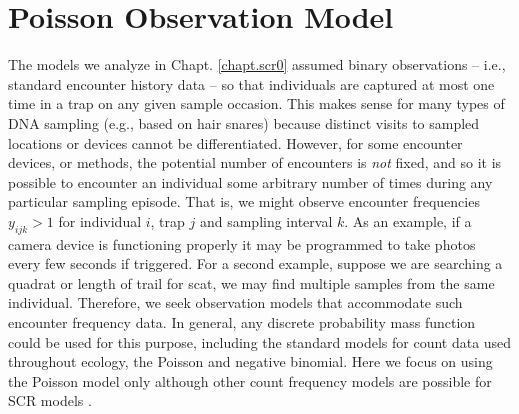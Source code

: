 \section{Poisson Observation Model}
\label{poisson-mn.sec.poisson}

The models we analyze in Chapt. \ref{chapt.scr0} assumed binary
observations -- i.e., standard encounter history data -- so
that individuals are captured at most one time in a trap on any given
sample occasion.  This makes
sense for many types of DNA sampling (e.g., based on hair snares)
because distinct visits to sampled locations or devices cannot be
differentiated. However, for some encounter devices, or methods, the
potential number of encounters is {\it not} fixed, and so it is
possible to encounter an individual some arbitrary number of times
during any particular sampling episode.
That is, we might observe
encounter frequencies $y_{ijk}>1$
for individual $i$, trap $j$ and
sampling interval $k$.  As an example, if a camera device is
functioning properly it may be programmed to take photos every few
seconds if triggered.  For a second example, suppose we are searching
a quadrat or length of trail for scat, we may find multiple samples from the same
individual.
Therefore, we seek observation models that accommodate such encounter
frequency data.  In general, any discrete probability mass function
could be used for this purpose, including the standard models for
count data used throughout ecology, the Poisson and negative
binomial.  Here we focus on using the Poisson
model only although other count frequency models are possible for SCR models
\citep{efford_etal:2009ecol}.

